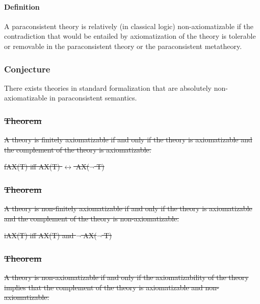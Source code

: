 \hypertarget{definition-5}{%
\paragraph{Definition}\label{definition-5}}

A paraconsistent theory is relatively (in classical logic)
non-axiomatizable if the contradiction that would be entailed by
axiomatization of the theory is tolerable or removable in the
paraconsistent theory or the paraconsistent metatheory.

\hypertarget{conjecture-3}{%
\subsubsection{Conjecture}\label{conjecture-3}}

There exists theories in standard formalization that are absolutely
non-axiomatizable in paraconsistent semantics.

\hypertarget{theorem-12}{%
\subsubsection{\texorpdfstring{\st{Theorem}}{Theorem}}\label{theorem-12}}

\st{A theory is finitely axiomatizable if and only if the theory is
axiomatizable and the complement of the theory is axiomatizable.}

\st{fAX(T) iff AX(T) $\leftrightarrow$  AX($\neg$ T)}

\hypertarget{theorem-13}{%
\subsubsection{\texorpdfstring{\st{Theorem}}{Theorem}}\label{theorem-13}}

\st{A theory is non-finitely axiomatizable if and only if the theory is
axiomatizable and the complement of the theory is non-axiomatizable.}

\st{iAX(T) iff AX(T) and $\neg$ AX($\neg$ T)}

\hypertarget{theorem-14}{%
\subsubsection{\texorpdfstring{\st{Theorem}}{Theorem}}\label{theorem-14}}

\st{A theory is non-axiomatizable if and only if the axiomatizability of
the theory implies that the complement of the theory is axiomatizable
and non-axiomatizable.}

